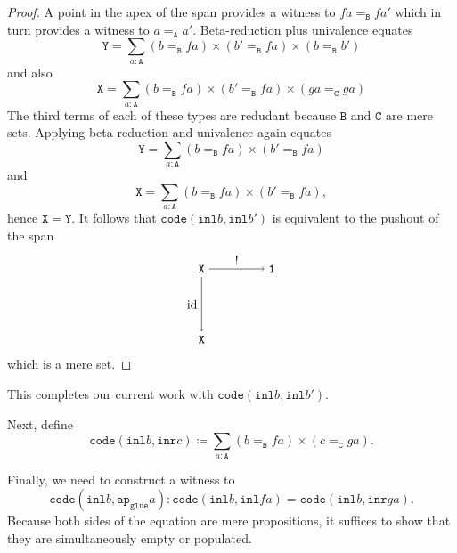 \message{ !name(notes.tex)}\documentclass[12pt]{amsart}
\newcommand{\bydef}{\coloneqq}
\newcommand{\type}[1]{\mathtt{#1}}
\newcommand{\tin}{\colon}
\newcommand{\A}{\type{A}}
\newcommand{\B}{\type{B}}
\newcommand{\C}{\type{C}}
\newcommand{\ap}{\type{ap}}
\newcommand{\inl}{\type{inl}}
\newcommand{\inr}{\type{inr}}
\newcommand{\glue}{\type{glue}}
\newcommand{\code}{\type{code}}
\DeclareMathOperator{\id}{id}
\theoremstyle{remark}
\theoremstyle{definition}
\begin{document}
\begin{proof}
  A point in the apex of the span provides a witness to
  \(
      fa =_\B fa'
  \)
  which in turn provides a witness to
  \(
      a =_\A a'.
  \)
  Beta-reduction plus univalence equates
  \[
    \type{Y} =
    \sum\limits_{a \tin \A}
    (b=_{\B} fa) \times (b'=_{\B} fa) \times (b=_{\B} b')
  \]
  and also
  \[
    \type{X} =
    \sum\limits_{a \tin \A}
    (b=_{\B} fa) \times (b'=_{\B} fa) \times ( ga =_{\C} ga )
  \]
  The third terms of each of these types are redudant because \( \B \)
  and \( \C \) are mere sets. Applying beta-reduction and univalence
  again equates
  \[
    \type{Y} =
    \sum\limits_{a \tin \A}
    (b=_{\B} fa) \times (b'=_{\B} fa)
  \]
  and
  \[
    \type{X} =
    \sum\limits_{a \tin \A}
    (b=_{\B} fa) \times (b'=_{\B} fa),
  \]
  hence
  \(
      \type{X} = \type{Y}.
  \)
  It follows that
  \(
      \code ( \inl b , \inl b')
  \)
  is equivalent to the pushout of the span
  \[
    \begin{tikzpicture}
      \node (1) at (-1,1) {\( \type{X} \)};
      \node (2) at (-1,-1) {\( \type{X} \)};
      \node (3) at (1,1) {\( \type{1} \)};
      \draw [->] (1) to node [left] {\( \id \)} (2);
      \draw [->] (1) to node [above] {\( ! \)} (3);
    \end{tikzpicture}
  \]
  which is a mere set.
%  
\end{proof}


This completes our current work with
\(
    \code ( \inl b , \inl b' ).
\)
\par

Next, define
\[
  \code ( \inl b , \inr c ) \bydef
  \sum_{ a : \A } ( b =_\B fa ) \times ( c =_\C ga ).
\]

Finally, we need to construct a witness to
\[
  \code ( \inl b , \ap_{\glue} a ) \tin
  \code ( \inl b , \inl fa ) =
  \code ( \inl b , \inr ga ). 
\]
Because both sides of the equation are mere propositions, it suffices
to show that they are simultaneously empty or populated.
\par

\end{document}

